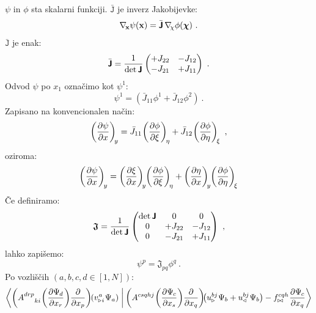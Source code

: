$\psi$ in $\phi$ sta skalarni funkciji. $\bar{\texttt{J}}$ je inverz Jakobijevke:
\begin{equation}
   \mathbf{\nabla_{\mkern-3mu x}} \psi(\mathbf{x}) = \bar{\bm{\mathsf{J}}} \mkern3mu \mathbf{\nabla_{\mkern-4mu \chi}} \phi(\bm{\chi}) \ .
\end{equation}
$\bar{\texttt{J}}$ je enak:
\begin{equation}
   \bar{\bm{\mathsf{J}}}
   =
   \frac{1}{\det \bm{\mathsf{J}}}
   \begin{pmatrix}
      +J_{22} & -J_{12} \\
      -J_{21} & +J_{11}
   \end{pmatrix}
   \ .
\end{equation}
Odvod $\psi$ po $x_1$ označimo kot $\psi^1$:
\begin{equation}
   \psi^1 = \left(\bar{J}_{11} \phi^1 + \bar{J}_{12} \phi^2 \right) \ .
\end{equation}
Zapisano na konvencionalen način:
\begin{equation}
   \left(\frac{\partial \psi}{\partial x}\right)_{\mkern-4mu y}
   =
   \bar{J}_{11} \mkern-2mu \left(\frac{\partial \phi}{\partial \xi}\right)_{\mkern-3mu \eta}
   +
   \bar{J}_{12} \mkern-2mu \left(\frac{\partial \phi}{\partial \eta}\right)_{\mkern-3mu \xi} \ ,
\end{equation}
oziroma:
\begin{equation}
   \left(\frac{\partial \psi}{\partial x} \right)_{\mkern-3mu y}
   =
   \left(\frac{\partial \xi}{\partial x} \right)_{\mkern-4mu y}
   \mkern-4mu \left(\frac{\partial \phi}{\partial \xi}\right)_{\mkern-3mu \eta}
   +
   \left(\frac{\partial \eta}{\partial x}\right)_{\mkern-4mu y}
   \mkern-4mu \left(\frac{\partial \phi}{\partial \eta}\right)_{\mkern-3mu \xi}
\end{equation}
Če definiramo:
\begin{equation}
   \bm{\mathsf{\mathfrak{J}}}
   =
   \frac{1}{\det \bm{\mathsf{J}}}
   \begin{pmatrix}
      \det \bm{\mathsf{J}} & 0       & 0       \\
      0                & +J_{22} & -J_{12} \\
      0                & -J_{21} & +J_{11}
   \end{pmatrix} \ ,
\end{equation}
lahko zapišemo:
\begin{equation}
   \psi^p = \mathfrak{J}_{pq} \phi^{q} \ .
   \label{eq:refToEmt}
\end{equation}
Po vozliščih $(a, b, c, d \in [1,N])$:
\begin{equation}
   \braket{
      \qty(A^{d r p}_{\mkern28mu k i} \mkern1mu    \qty( \pdv{\Psi_{\mkern-1mu d}}{x_r} ) \pdv{}{x_p} ) \mkern-2mu
      \qty(v^{\mkern1mu a}_{\triangleright \mkern1mu i} \mkern1mu \Psi_a ) \mkern5mu  }
   {
      \mkern4mu \qty(A^{c s q h j} \mkern1mu     \qty( \pdv{\Psi_{\mkern-1mu c}}{x_s} ) \pdv{}{x_q} ) \mkern-4mu
      \qty(u^{b j}_\triangleright \mkern1mu \Psi_b + u^{b j}_\triangleleft \mkern1mu \Psi_b )
      -
      f^{c q h}_{\bowtie} \mkern1mu \pdv{\Psi_{\mkern-1mu c}}{x_q} }
\end{equation}

